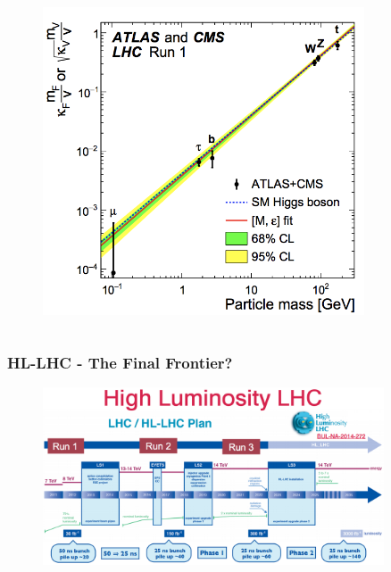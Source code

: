 \documentclass[xcolor={usenames,dvipsnames,svgnames,table}]{beamer}
\begin{document}
\begin{frame}
\begin{columns}
\begin{column}{0.49\textwidth}
\begin{figure}[b]
		\includegraphics[width=0.85\textwidth]{plots/higgscoupling_masses.png}
	\end{figure}
	\end{column}
	\end{columns}
\end{frame}


\begin{frame}
	\frametitle{HL-LHC - The Final Frontier?}
	\begin{figure}[t]
		\includegraphics[width=0.9\textwidth]{plots/hllhc.png}
	\end{figure}
\end{frame}
\end{document}

